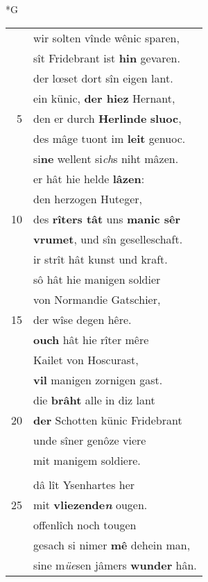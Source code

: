 \documentclass[8pt,a4paper,notitlepage]{article}
\begin{document}
\newpage
\begin{table}[ht]
\begin{minipage}[t]{0.5\linewidth}
\small
\begin{center}*G
\end{center}
\begin{tabular}{rl}
 & wir solten vînde wênic sparen,\\ 
 & sît Fridebrant ist \textbf{hin} gevaren.\\ 
 & der lœset dort sîn eigen lant.\\ 
 & ein künic, \textbf{der hiez} Hernant,\\ 
5 & den er durch \textbf{Herlinde} \textbf{sluoc},\\ 
 & des mâge tuont im \textbf{leit} genuoc.\\ 
 & si\textbf{ne} wellent si\textit{ch}s niht mâzen.\\ 
 & er hât hie helde \textbf{lâzen}:\\ 
 & den herzogen Huteger,\\ 
10 & des \textbf{rîters tât} uns \textbf{manic sêr}\\ 
 & \textbf{vrumet}, und sîn geselleschaft.\\ 
 & ir strît hât kunst und kraft.\\ 
 & sô hât hie manigen soldier\\ 
 & von Normandie Gatschier,\\ 
15 & der wîse degen hêre.\\ 
 & \textbf{ouch} hât hie rîter mêre\\ 
 & Kailet von Hoscurast,\\ 
 & \textbf{vil} manigen zornigen gast.\\ 
 & die \textbf{brâht} alle in diz lant\\ 
20 & \textbf{der} Schotten künic Fridebrant\\ 
 & unde sîner genôze viere\\ 
 & mit manigem soldiere.\\ 
 & \textbf{\begin{large}D\end{large}ort westerthalp} an dem mer,\\ 
 & dâ lît Ysenhartes her\\ 
25 & mit \textbf{vliezende\textit{n}} ougen.\\ 
 & offenlîch noch tougen\\ 
 & gesach si nimer \textbf{mê} dehein man,\\ 
 & sine m\textit{üe}sen jâmers \textbf{wunder} hân.\\ 

\end{tabular}
\end{minipage}
\end{table}
\end{document}
